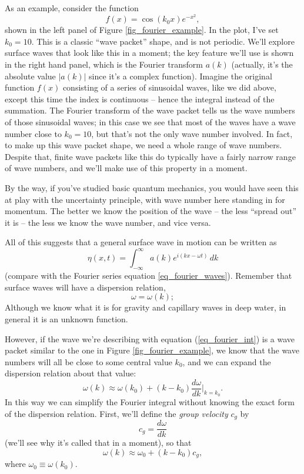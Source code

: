 As an example, consider the function
\[
f(x) = \cos(k_0 x) e^{-x^2},
\]
shown in the left panel of Figure \ref{fig_fourier_example}.  In the plot, I've set $k_0 = 10$.  This is a classic ``wave packet'' shape, and is not periodic.  We'll explore surface waves that look like this in a moment; the key feature we'll use is shown in the right hand panel, which is the Fourier transform $a(k)$ (actually, it's the absolute value $|a(k)|$ since it's a complex function).  Imagine the original function $f(x)$ consisting of a series of sinusoidal waves, like we did above, except this time the index is continuous -- hence the integral instead of the summation.  The Fourier transform of the wave packet tells us the wave numbers of those sinusoidal waves; in this case we see that most of the waves have a wave number close to $k_0 = 10$, but that's not the only wave number involved.  In fact, to make up this wave packet shape, we need a whole range of wave numbers.  Despite that, finite wave packets like this do typically have a fairly narrow range of wave numbers, and we'll make use of this property in a moment.

By the way, if you've studied basic quantum mechanics, you would have seen this at play with the uncertainty principle, with wave number here standing in for momentum.  The better we know the position of the wave -- the less ``spread out'' it is -- the less we know the wave number, and vice versa.  

All of this suggests that a general surface wave in motion can be written as
\begin{equation}
\label{eq_fourier_int}
\eta (x, t) = \int_{-\infty}^\infty a(k) e^{i(kx - \omega t)} \, dk
\end{equation}
(compare with the Fourier series equation \ref{eq_fourier_waves}).  Remember that surface waves will have a dispersion relation,
\[
\omega = \omega (k);
\]
Although we know what it is for gravity and capillary waves in deep water, in general it is an unknown function.

However, if the wave we're describing with equation (\ref{eq_fourier_int}) is a wave packet similar to the one in Figure \ref{fig_fourier_example}, we know that the wave numbers will all be close to some central value $k_0$, and we can expand the dispersion relation about that value:
\[
\omega(k) \approx \omega(k_0) + (k - k_0) \frac{d\omega}{dk} \bigg|_{k=k_0}.
\]
In this way we can simplify the Fourier integral without knowing the exact form of the dispersion relation.  First, we'll define the \emph{group velocity} $c_g$ by
\begin{equation}
\boxed{
c_g = \frac{d\omega}{dk}
}
\end{equation}
(we'll see why it's called that in a moment), so that
\[
\omega(k) \approx \omega_0 + (k - k_0) c_g,
\]
where $\omega_0 \equiv \omega(k_0)$.

